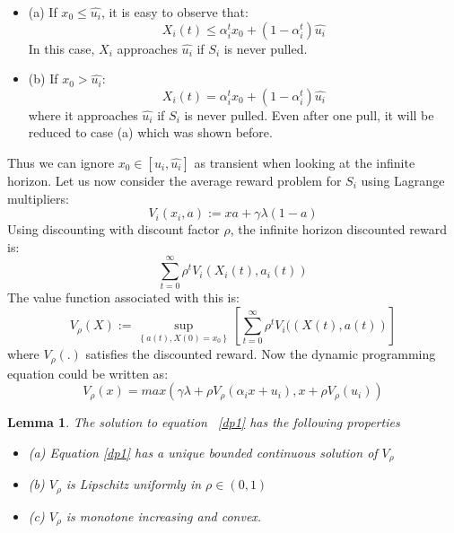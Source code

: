 \documentclass[conference]{IEEEtran}
\newtheorem{lemm}[theorem]{Lemma}
\begin{document}
\begin{itemize}
    \item (a) If $x_0 \leq \hat{u_i}$, it is easy to observe that:
\begin{equation}
    X_i(t) \leq \alpha_i^{t}x_0 + (1-\alpha_i^{t})\hat{u_i}
\end{equation}
In this case, $X_i$ approaches $\hat{u_i}$ if $S_i$ is never pulled.
\item (b) If $x_0 > \hat{u_i}$:
\begin{equation}
    X_i(t)=\alpha_i^{t}x_0 + (1-\alpha_i^{t})\hat{u_i}
\end{equation}
where it approaches $\hat{u_i}$ if $S_i$ is never pulled. Even after one pull, it will be reduced to case (a) which was shown before.
\end{itemize}
Thus we can ignore $x_0 \in \left[u_i, \hat{u_i} \right]$ as transient when looking at the infinite horizon. 
Let us now consider the average reward problem for $S_i$ using Lagrange multipliers:
\begin{equation}
    V_i(x_i, a):= xa + \gamma \lambda(1-a)
\end{equation}
Using discounting with discount factor $\rho$, the infinite horizon discounted reward is:
\begin{equation}
    \sum_{t=0}^{\infty} \rho^{t}V_i(X_i(t), a_i(t))
\end{equation}
The value function associated with this is:
\begin{equation}
    V_\rho(X) := \sup_{\left\{a(t), X(0)=x_0\right\}} \left [\sum_{t=0}^{\infty} \rho^{t}V_i((X(t), a(t))\right]
\end{equation}
where $V_\rho(.)$ satisfies the discounted reward. Now the dynamic programming equation could be written as:
\begin{equation}
    \label{dp1}
    V_\rho(x) = max(\gamma \lambda + \rho V_\rho(\alpha_i x + u_i), x + \rho V_\rho(u_i))
\end{equation}

\begin{lemm}
\label{lemma}
The solution to equation ~\ref{dp1} has the following properties
\begin{itemize}
    \item (a) Equation \ref{dp1} has a unique bounded continuous solution     of $V_\rho$
    \item (b) $V_\rho$ is Lipschitz uniformly in $\rho \in (0,1)$
    \item (c) $V_\rho$ is monotone increasing and convex.
\end{itemize}
\end{lemm}
\end{document}
